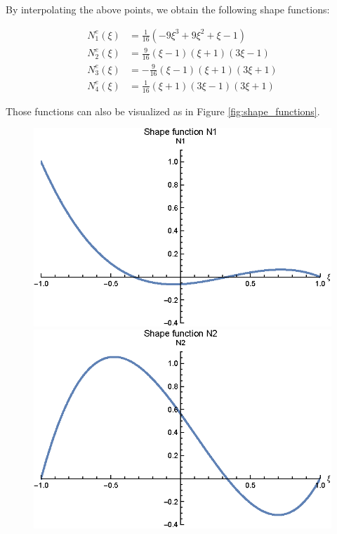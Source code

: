 By interpolating the above points, we obtain the following shape functions:

\begin{align}
    N_1^e(\xi) & = \frac{1}{16} (-9 \xi ^3+9 \xi ^2+\xi -1)    \\
    N_2^e(\xi) & = \frac{9}{16} (\xi -1) (\xi +1) (3 \xi -1)   \\
    N_3^e(\xi) & = -\frac{9}{16}(\xi -1) (\xi +1) (3 \xi +1)   \\
    N_4^e(\xi) & = \frac{1}{16} (\xi +1) (3 \xi -1) (3 \xi +1)
\end{align}

Those functions can also be visualized as in Figure \ref{fig:shape_functions}.

\begin{figure}[H]
    \begin{minipage}[b]{0.45\textwidth}
        \centering
        \includegraphics[width=\textwidth]{pdf/shape_function_N1}
    \end{minipage}
    \hfill
    \begin{minipage}[b]{0.45\textwidth}
        \centering
        \includegraphics[width=\textwidth]{pdf/shape_function_N2}

\end{minipage}
\end{figure}
